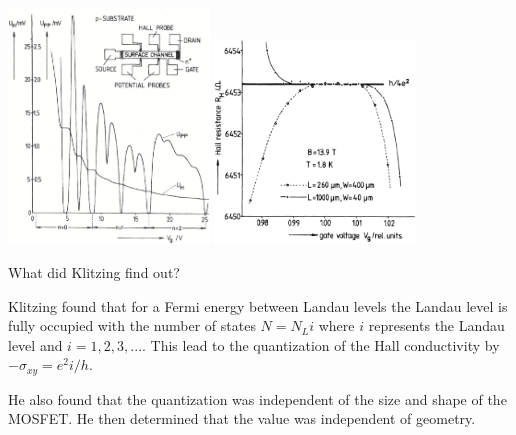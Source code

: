 \documentclass{beamer}
\begin{document}
\begin{frame}
\begin{center}
\includegraphics[width=0.4\textwidth]{QHEKlitz1.eps}
\includegraphics[width=0.4\textwidth]{QHEKlitz3.eps}
\end{center}
\begin{block}
{What did Klitzing find out?}
\begin{itemize}
\footnotesize{
\item Klitzing found that for a Fermi energy between Landau levels the Landau level is fully occupied with the number of states $N = N_Li$ where $i$ represents the Landau level and $i=1,2,3,...$. This lead to the quantization of the Hall conductivity by $-\sigma_{xy} = e^2i/h$.
\item He also found that the quantization was independent of the size and shape of the MOSFET. He then determined that the value was independent of geometry.
}
\end{itemize}
\end{block}
\end{frame}
\end{document}
